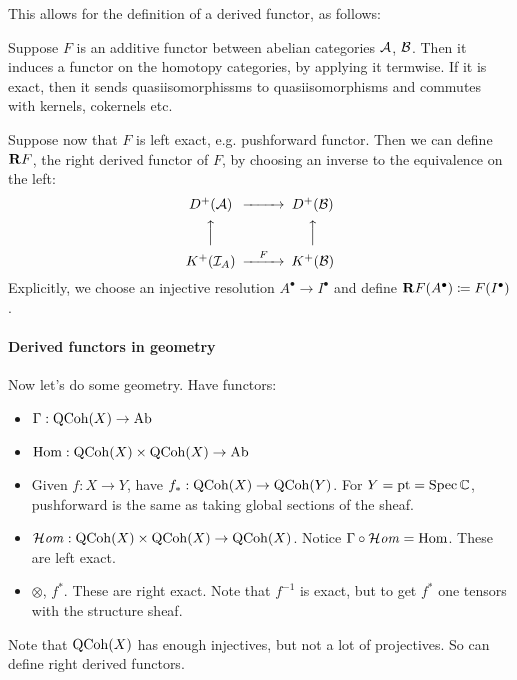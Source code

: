 This allows for the definition of a derived functor, as follows:

Suppose $F$ is an additive functor between abelian categories $\mathcal{A}$, $\mathcal{B}$. Then it induces a functor on the homotopy categories, by applying it termwise. If it is exact, then it sends quasiisomorphissms to quasiisomorphisms and commutes with kernels, cokernels etc.

Suppose now that $F$ is left exact, e.g. pushforward functor. Then we can define $\mathbf{R} F$, the right derived functor of $F$, by choosing an inverse to the equivalence on the left:
\begin{equation*}
    \begin{CD}
        D^+(\calA) @>>> D^+(\calB) \\
          @AAA @AAA \\
        K^+(\calI_A) @>F>> K^+(\calB)
    \end{CD}
\end{equation*}
Explicitly, we choose an injective resolution $A^\bullet\to I^\bullet$ and
define $\mathbf{R} F(A^\bullet)\coloneqq F(I^\bullet)$.



\paragraph{Derived functors in geometry}


Now let's do some geometry. Have functors:

\begin{itemize}
    \item $\Gamma:\operatorname{QCoh}(X)\to\mathrm{Ab}$
    \item $\operatorname{Hom}:\operatorname{QCoh}(X)\times\operatorname{QCoh}(X)\to\mathrm{Ab}$
    \item Given $f:X\to Y$, have $f_*:\operatorname{QCoh}(X)\to\operatorname{QCoh}(Y)$. For $Y=\mathrm{pt}=\operatorname{Spec}\mathbb{C}$, pushforward is the same as taking global sections of the sheaf.
    \item $\operatorname{\mathcal{H}\mathit{om}}:\operatorname{QCoh}(X)\times\operatorname{QCoh}(X)\to\operatorname{QCoh}(X)$. Notice $\Gamma\circ\operatorname{\mathcal{H}\mathit{om}}=\operatorname{Hom}$. These are left exact.
    \item $\otimes$, $f^*$. These are right exact. Note that $f^{-1}$ is exact, but to get $f^*$ one tensors with the structure sheaf.
\end{itemize}

Note that $\operatorname{QCoh}(X)$ has enough injectives, but not a lot of projectives. So can define right derived functors.


